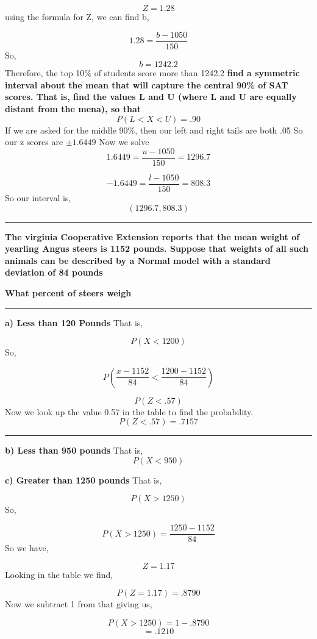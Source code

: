 \documentclass{report}
\begin{document}
$$ Z = 1.28$$
using the formula for Z, we can find b, 

$$ 1.28= \frac{b - 1050}{150}$$
So,
$$ b = 1242.2$$
\bigbreak \noindent
Therefore, the top 10\% of students score more than 1242.2
\bigbreak \noindent
\textbf{find a symmetric interval about the mean that will capture the central 90\% of SAT scores. That is, find the values L and U (where L and U are equally distant from the mena), so that} $$P(L < X < U) = .90$$
\bigbreak \noindent
 If we are asked for the middle 90\%, then our left and right tails are both .05
\bigbreak \noindent
So our z scores are $\pm{1.6449}$
\bigbreak \noindent
Now we solve
$$ 1.6449 = \frac{u - 1050}{150} = 1296.7$$

$$ -1.6449 = \frac{l -1050}{150} = 808.3$$
So our interval is,
$$(1296.7, 808.3)$$
\bigbreak \noindent
\hrule
\bigbreak \noindent
\q
\bigbreak \noindent
\textbf{The virginia Cooperative Extension reports that the mean weight of yearling Angus steers is 1152 pounds. Suppose that weights of all such animals can be described by a Normal model with a standard deviation of 84 pounds}
\bigbreak \noindent
\centerline{\textbf{What percent of steers weigh}}
  \bigbreak \noindent
  \hrule
  \bigbreak \noindent
  \textbf{a) Less than 120 Pounds}
\bigbreak \noindent
  That is,

  $$P(X < 1200)$$
  So,

  $$ P(\frac{x-1152}{84} < \frac{1200 - 1152}{84})$$

  $$ P(Z < .57)$$
  \bigbreak \noindent
Now we look up the value 0.57 in the table to find the probability.
$$ P(Z < .57) = .7157$$
\bigbreak \noindent
\hrule
\bigbreak \noindent
\textbf{b) Less than 950 pounds}
\bigbreak \noindent
That is,
$$ P(X < 950)$$

\pagebreak
\noindent
\textbf{c) Greater than 1250 pounds}
\bigbreak \noindent
That is,

$$P(X > 1250)$$
So,

$$P(X > 1250) = \frac{1250- 1152}{84}$$
So we have,

$$ Z = 1.17$$
Looking in the table we find,

$$P(Z = 1.17) = .8790$$
Now we subtract 1 from that giving us,

$$P(X > 1250) = 1 - .8790$$
$$ = .1210$$
\bigbreak \noindent
{}
\end{document}
